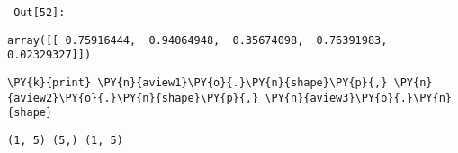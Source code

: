         {\par%
        \vspace{-1\smallerfontscale}%
        \noindent%
        \begin{minipage}{\cellleftmargin}%
    \hfill%
    {\smaller%
    \tt%
    \color{nbframe-out-prompt}%
    Out[52]:}%
    \hspace{\inputpadding}%
    \hspace{0em}%
    \hspace{3pt}%
    \end{minipage}%
        }%
    \begin{addmargin}[\cellleftmargin]{0em}%
    {\smaller%
    \vspace{-1\smallerfontscale}%
    
    
    
    \begin{verbatim}
array([[ 0.75916444,  0.94064948,  0.35674098,  0.76391983,  0.02329327]])
    \end{verbatim}

    
}%
    \end{addmargin}%

{\par%
\vspace{-1\baselineskip}%
}%
\begin{notebookcell}[53]%
\begin{addmargin}[\cellleftmargin]{0em}%
{\smaller%
\par%
%
\vspace{-1\smallerfontscale}%
\begin{Verbatim}[commandchars=\\\{\}]
\PY{k}{print} \PY{n}{aview1}\PY{o}{.}\PY{n}{shape}\PY{p}{,} \PY{n}{aview2}\PY{o}{.}\PY{n}{shape}\PY{p}{,} \PY{n}{aview3}\PY{o}{.}\PY{n}{shape}
\end{Verbatim}
%
\par%
\vspace{-1\smallerfontscale}}%
\end{addmargin}
\end{notebookcell}

\par\vspace{1\smallerfontscale}%
    \begin{addmargin}[\cellleftmargin]{0em}%
    {\smaller%
    \vspace{-1\smallerfontscale}%
    
    \begin{Verbatim}[commandchars=\\\{\}]
(1, 5) (5,) (1, 5)
    \end{Verbatim}
}%
    \end{addmargin}%

